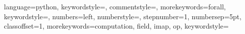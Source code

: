 {
  language=python, 
  keywordstyle=\color{red}, 
  commentstyle=\color{blue}, 
  morekeywords={forall},   keywordstyle=\color{red},        
  numbers=left, numberstyle=\tiny, stepnumber=1, numbersep=5pt,
  classoffset=1,
  morekeywords={computation, field, imap, op},   keywordstyle=\color{purple}
}
